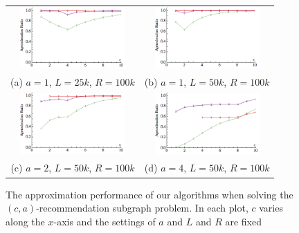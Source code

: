 \begin{figure}
\begin{tabular}{cc}
  \includegraphics[width=40mm]{images/l=25000,r=100000_Greedy_vs_Naive_error.png} &   \includegraphics[width=40mm]{images/l=50000,r=100000_Greedy_vs_Naive_error.png} \\
(a) $a=1$, $L=25k$, $R=100k$ & (b) $a=1$, $L=50k$, $R=100k$ \\[6pt]
 \includegraphics[width=40mm]{images/l=50000,r=100000,a=2_Greedy_vs_Naive_error.png} &   \includegraphics[width=40mm]{images/l=50000,r=100000,a=4_Greedy_vs_Naive_error.png}\\
(c) $a=2$, $L=50k$, $R=100k$ & (d) $a=4$, $L=50k$, $R=100k$ \\[6pt]
\end{tabular}
\label{fig:sim_combo}
\caption{The approximation performance of our algorithms when solving the $(c,a)$-recommendation subgraph problem. In each plot, $c$ varies along the $x$-axis and the settings of $a$ and $L$ and $R$ are fixed}
\end{figure}



